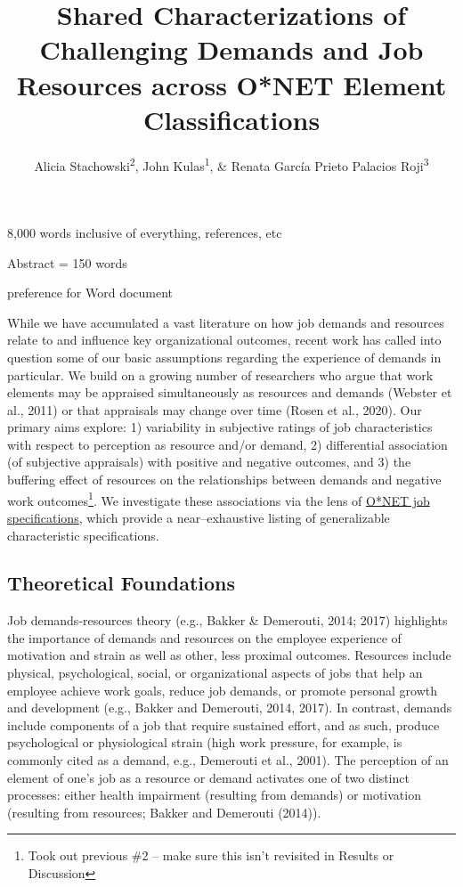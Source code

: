 \documentclass[
  man]{apa7}
\title{Shared Characterizations of Challenging Demands and Job Resources across O*NET Element Classifications}
\author{Alicia Stachowski\textsuperscript{2}, John Kulas\textsuperscript{1}, \& Renata García Prieto Palacios Roji\textsuperscript{3}}
\date{}
\affiliation{\vspace{0.5cm}\textsuperscript{1} eRg\\\textsuperscript{2} University of Wisconsin - Stout\\\textsuperscript{3} PepsiCo}
\begin{document}
\maketitle

8,000 words inclusive of everything, references, etc

Abstract = 150 words

preference for Word document

While we have accumulated a vast literature on how job demands and resources relate to and influence key organizational outcomes, recent work has called into question some of our basic assumptions regarding the experience of demands in particular. We build on a growing number of researchers who argue that work elements may be appraised simultaneously as resources and demands (Webster et al., 2011) or that appraisals may change over time (Rosen et al., 2020). Our primary aims explore: 1) variability in subjective ratings of job characteristics with respect to perception as resource and/or demand, 2) differential association (of subjective appraisals) with positive and negative outcomes, and 3) the buffering effect of resources on the relationships between demands and negative work outcomes\footnote{Took out previous \#2 -- make sure this isn't revisited in Results or Discussion}. We investigate these associations via the lens of \href{https://www.onetcenter.org/content.html}{O*NET job specifications}, which provide a near--exhaustive listing of generalizable characteristic specifications.

\hypertarget{theoretical-foundations}{%
\subsection{Theoretical Foundations}\label{theoretical-foundations}}

Job demands-resources theory (e.g., Bakker \& Demerouti, 2014; 2017) highlights the importance of demands and resources on the employee experience of motivation and strain as well as other, less proximal outcomes. Resources include physical, psychological, social, or organizational aspects of jobs that help an employee achieve work goals, reduce job demands, or promote personal growth and development (e.g., Bakker and Demerouti, 2014, 2017). In contrast, demands include components of a job that require sustained effort, and as such, produce psychological or physiological strain (high work pressure, for example, is commonly cited as a demand, e.g., Demerouti et al., 2001). The perception of an element of one's job as a resource or demand activates one of two distinct processes: either health impairment (resulting from demands) or motivation (resulting from resources; Bakker and Demerouti (2014)).
\end{document}
